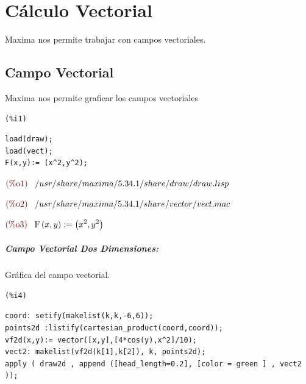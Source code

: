 \documentclass[12pt]{article}
\begin{document}
\section{Cálculo Vectorial}
Maxima nos permite trabajar con campos vectoriales.
\subsection{Campo Vectorial}
Maxima nos permite graficar los campos vectoriales

\noindent
\begin{minipage}[t]{8ex}{\color{red}\bf
\begin{verbatim}
(%i1) 
\end{verbatim}}
\end{minipage}
\begin{minipage}[t]{\textwidth}{\color{blue}
\begin{verbatim}
load(draw);
load(vect);
F(x,y):= (x^2,y^2);
\end{verbatim}}
\end{minipage}
\begin{math}\displaystyle
\parbox{8ex}{\color{labelcolor}(\%o1) }
/usr/share/maxima/5.34.1/share/draw/draw.lisp
\end{math}

\begin{math}\displaystyle
\parbox{8ex}{\color{labelcolor}(\%o2) }
/usr/share/maxima/5.34.1/share/vector/vect.mac
\end{math}

\begin{math}\displaystyle
\parbox{8ex}{\color{labelcolor}(\%o3) }
\mathrm{F}\left( x,y\right) :=\left( {x}^{2},{y}^{2}\right) 
\end{math}


\subparagraph{Campo Vectorial Dos Dimensiones:}
Gráfica del campo vectorial.

\noindent
\begin{minipage}[t]{8ex}{\color{red}\bf
\begin{verbatim}
(%i4) 
\end{verbatim}}
\end{minipage}
\begin{minipage}[t]{\textwidth}{\color{blue}
\begin{verbatim}
coord: setify(makelist(k,k,-6,6));
points2d :listify(cartesian_product(coord,coord));
vf2d(x,y):= vector([x,y],[4*cos(y),x^2]/10);
vect2: makelist(vf2d(k[1],k[2]), k, points2d);
apply ( draw2d , append ([head_length=0.2], [color = green ] , vect2 ));
\end{verbatim}}
\end{minipage}
\end{document}

